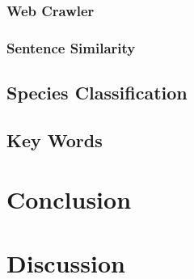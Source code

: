 \documentclass[a4paper, 12pt, oneside]{book} %
\begin{document}
\subsubsection{Web Crawler}

\subsubsection{Sentence Similarity}

\subsection{Species Classification}
\subsection{Key Words}

\section{Conclusion}
\section{Discussion}

\printbibliography
\end{document}
